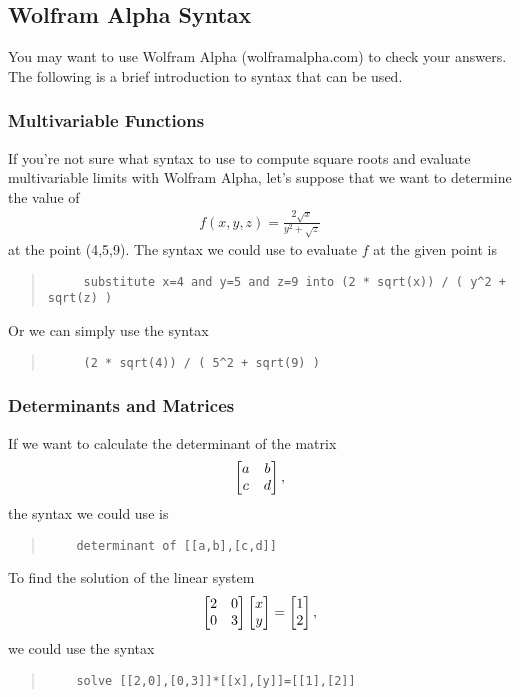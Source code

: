 \setcounter{subsection}{-1}
\subsection{Wolfram Alpha Syntax}
You may want to use Wolfram Alpha (wolframalpha.com) to check your answers. The following is a brief introduction to syntax that can be used. 
\subsubsection{Multivariable Functions}
If you're not sure what syntax to use to compute square roots and evaluate multivariable limits with Wolfram Alpha, let's suppose that we want to determine the value of
\begin{align*} 
  f(x,y,z) = \frac{2 \sqrt{x}}{y^2 + \sqrt{z}}
\end{align*}
at the point (4,5,9). The syntax we could use to evaluate $f$ at the given point is
\begin{quote}
  \begin{verbatim}
     substitute x=4 and y=5 and z=9 into (2 * sqrt(x)) / ( y^2 + sqrt(z) )
  \end{verbatim}
\end{quote}
Or we can simply use the syntax
\begin{quote}
  \begin{verbatim}
     (2 * sqrt(4)) / ( 5^2 + sqrt(9) )
  \end{verbatim}
\end{quote}
\subsubsection{Determinants and Matrices}
If we want to calculate the determinant of the matrix 
\begin{align*} 
  \begin{bmatrix} a & b \\ c & d \end{bmatrix},
\end{align*}
the syntax we could use is 
\begin{quote}
  \begin{verbatim}
    determinant of [[a,b],[c,d]]
  \end{verbatim}
\end{quote}
To find the solution of the linear system 
\begin{align*} 
  \begin{bmatrix} 2 & 0 \\ 0 & 3 \end{bmatrix} \begin{bmatrix} x \\ y \end{bmatrix} = \begin{bmatrix} 1 \\ 2 \end{bmatrix},
\end{align*}
we could use the syntax 
\begin{quote}
  \begin{verbatim}
    solve [[2,0],[0,3]]*[[x],[y]]=[[1],[2]] 
  \end{verbatim}
\end{quote}

